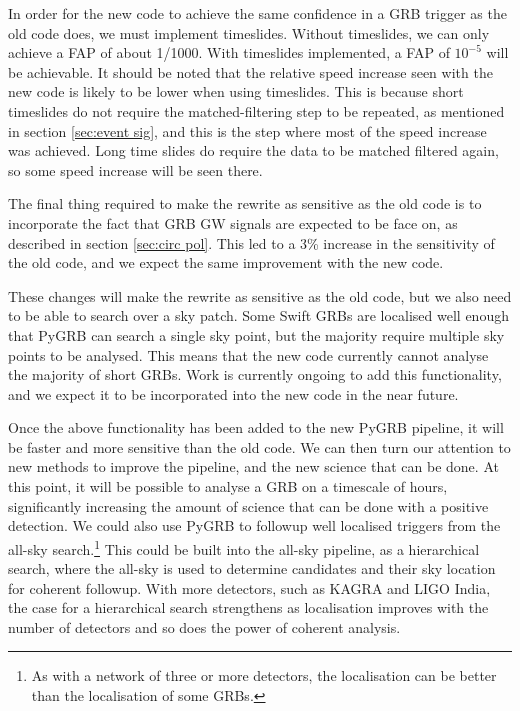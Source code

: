 \documentclass[11pt]{cuthesis}
\begin{document}
In order for the new code to achieve the same confidence in a GRB trigger as the old code does, we must implement timeslides. Without timeslides, we can only achieve a FAP of about 1/1000. With timeslides implemented, a FAP of $10^{-5}$ will be achievable. It should be noted that the relative speed increase seen with the new code is likely to be lower when using timeslides. This is because short timeslides do not require the matched-filtering step to be repeated, as mentioned in section \ref{sec:event sig}, and this is the step where most of the speed increase was achieved. Long time slides do require the data to be matched filtered again, so some speed increase will be seen there.

The final thing required to make the rewrite as sensitive as the old code is to incorporate the fact that GRB GW signals are expected to be face on, as described in section \ref{sec:circ pol}. This led to a 3\% increase in the sensitivity of the old code, and we expect the same improvement with the new code. 

These changes will make the rewrite as sensitive as the old code, but we also need to be able to search over a sky patch. Some Swift GRBs are localised well enough that PyGRB can search a single sky point, but the majority require multiple sky points to be analysed. This means that the new code currently cannot analyse the majority of short GRBs. Work is currently ongoing to add this functionality, and we expect it to be incorporated into the new code in the near future. 

Once the above functionality has been added to the new PyGRB pipeline, it will be faster and more sensitive than the old code. We can then turn our attention to new methods to improve the pipeline, and the new science that can be done. At this point, it will be possible to analyse a GRB on a timescale of hours, significantly increasing the amount of science that can be done with a positive detection. We could also use PyGRB to followup well localised triggers from the all-sky search.\footnote{As with a network of three or more detectors, the localisation can be better than the localisation of some GRBs.} This could be built into the all-sky pipeline, as a hierarchical search, where the all-sky is used to determine candidates and their sky location for coherent followup. With more detectors, such as KAGRA and LIGO India, the case for a hierarchical search strengthens as localisation improves with the number of detectors and so does the power of coherent analysis.
\end{document}
